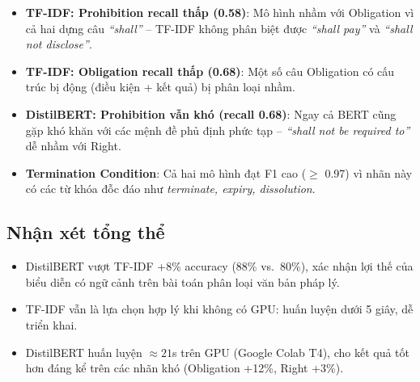 \begin{itemize}
    \item \textbf{TF-IDF: Prohibition recall thấp (0.58)}: Mô hình nhầm với Obligation vì cả hai dựng câu \textit{``shall''} -- TF-IDF không phân biệt được \textit{``shall pay''} và \textit{``shall not disclose''}.
    \item \textbf{TF-IDF: Obligation recall thấp (0.68)}: Một số câu Obligation có cấu trúc bị động (điều kiện + kết quả) bị phân loại nhầm.
    \item \textbf{DistilBERT: Prohibition vẫn khó (recall 0.68)}: Ngay cả BERT cũng gặp khó khăn với các mệnh đề phủ định phức tạp -- \textit{``shall not be required to''} dễ nhầm với Right.
    \item \textbf{Termination Condition}: Cả hai mô hình đạt F1 cao ($\ge$ 0.97) vì nhãn này có các từ khóa đỗc đáo như \textit{terminate, expiry, dissolution}.
\end{itemize}

\subsection{Nhận xét tổng thể}

\begin{itemize}
    \item DistilBERT vượt TF-IDF +8\% accuracy (88\% vs.\ 80\%), xác nhận lợi thế của biểu diễn có ngữ cảnh trên bài toán phân loại văn bản pháp lý.
    \item TF-IDF vẫn là lựa chọn hợp lý khi không có GPU: huấn luyện dưới 5 giây, dễ triển khai.
    \item DistilBERT huấn luyện $\approx 21$s trên GPU (Google Colab T4), cho kết quả tốt hơn đáng kể trên các nhãn khó (Obligation +12\%, Right +3\%).
\end{itemize}

